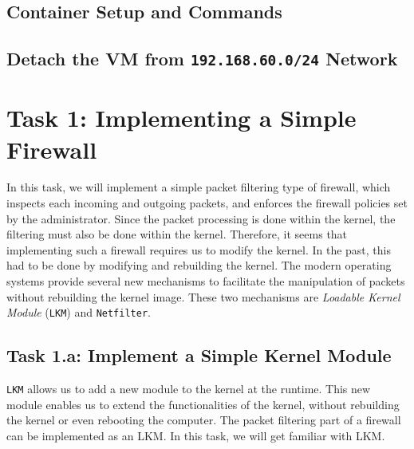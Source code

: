 \subsection{Container Setup and Commands}




\subsection{Detach the VM from \texttt{192.168.60.0/24} Network} 




\section{Task 1: Implementing a Simple Firewall} 


In this task, we will implement a simple packet filtering 
type of firewall, which 
inspects each incoming and outgoing packets, and enforces the firewall policies 
set by the administrator. Since the packet 
processing is done within the kernel, the filtering must also be 
done within the kernel. Therefore, it seems that implementing such
a firewall requires us to modify the \linux kernel. In the past, 
this had to be done by modifying and rebuilding 
the kernel. The modern \linux 
operating systems provide several new mechanisms 
to facilitate the manipulation of packets without rebuilding
the kernel image. These two mechanisms are 
\textit{Loadable Kernel Module} (\texttt{LKM}) and \texttt{Netfilter}.



\subsection{Task 1.a: Implement a Simple Kernel Module}


{\tt LKM} allows us to add a new module to the kernel at the runtime. 
This new module enables us to extend the functionalities of the kernel,
without rebuilding the kernel or even rebooting the computer. 
The packet filtering part of a firewall can be implemented as an LKM. 
In this task, we will get familiar with LKM.


